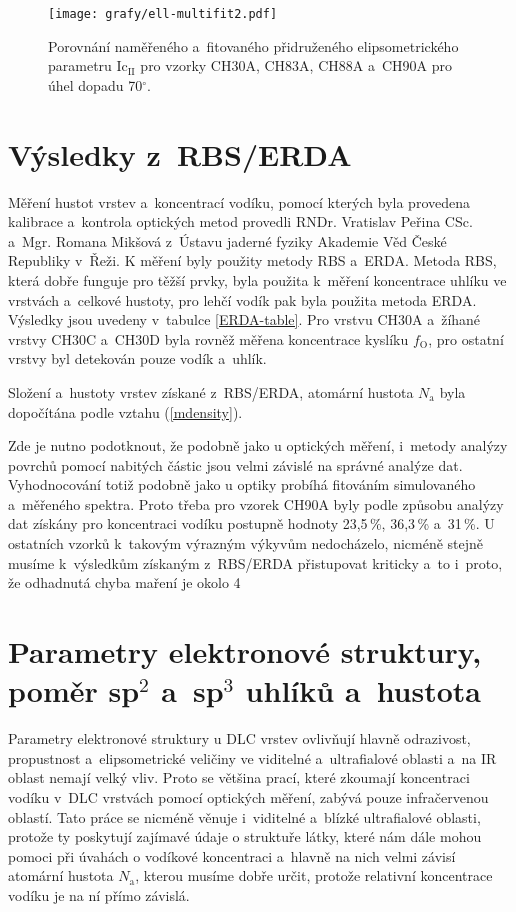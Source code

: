\begin{figure}[htp]
	\texttt{[image: grafy/ell-multifit2.pdf]}
	\caption{Porovnání naměřeného a~fitovaného přidruženého elipsometrického parametru Ic$_{\mathrm{II}}$ pro vzorky CH30A, CH83A, CH88A a~CH90A pro úhel dopadu 70$^\circ$.}
	\label{ell-multifit2}
\end{figure}

\section{Výsledky z~RBS/ERDA}
Měření hustot vrstev a~koncentrací vodíku, pomocí kterých byla provedena kalibrace a~kontrola optických metod provedli RNDr. Vratislav Peřina CSc. a~Mgr. Romana Mikšová z~Ústavu jaderné fyziky Akademie Věd České Republiky v~Řeži. K měření byly použity metody RBS a~ERDA. Metoda RBS, která dobře funguje pro těžší prvky, byla použita k~měření koncentrace uhlíku ve vrstvách a~celkové hustoty, pro lehčí vodík pak byla použita metoda ERDA. Výsledky jsou uvedeny v~tabulce \ref{ERDA-table}. Pro vrstvu CH30A a~žíhané vrstvy CH30C a~CH30D byla rovněž měřena koncentrace kyslíku $f_\mathrm{O}$, pro ostatní vrstvy byl detekován pouze vodík a~uhlík.

\begin{table}[h!]
 \centering
	\renewcommand{\tabcolsep}{4pt}
 
 \caption{Složení a~hustoty vrstev získané z~RBS/ERDA, atomární hustota $N_\mathrm{a}$ byla dopočítána podle vztahu (\ref{mdensity}).}
\label{ERDA-table}
\end{table}

Zde je nutno podotknout, že podobně jako u optických měření, i~metody analýzy povrchů pomocí nabitých částic jsou velmi závislé na správné analýze dat. Vyhodnocování totiž podobně jako u optiky probíhá fitováním simulovaného a~měřeného spektra. Proto třeba pro vzorek CH90A byly podle způsobu analýzy dat získány pro koncentraci vodíku postupně hodnoty 23,5\,\%, 36,3\,\% a~31\,\%. U ostatních vzorků k~takovým výrazným výkyvům nedocházelo, nicméně stejně musíme k~výsledkům získaným z~RBS/ERDA přistupovat kriticky a~to i~proto, že odhadnutá chyba maření je okolo 4\,%

\section{Parametry elektronové struktury, poměr sp$^2$ a~sp$^3$ uhlíků a~hustota}
Parametry elektronové struktury u DLC vrstev ovlivňují hlavně odrazivost, propustnost a~elipsometrické veličiny ve viditelné a~ultrafialové oblasti a~na IR oblast nemají velký vliv. 
Proto se většina prací, které zkoumají koncentraci vodíku v~DLC vrstvách pomocí optických měření, zabývá pouze infračervenou oblastí. Tato práce se nicméně věnuje i~viditelné a~blízké ultrafialové oblasti, protože ty poskytují zajímavé údaje o struktuře látky, které nám dále mohou pomoci při úvahách o vodíkové koncentraci a~hlavně na nich velmi závisí atomární hustota $N_\mathrm{a}$, kterou musíme dobře určit, protože relativní koncentrace vodíku je na ní přímo závislá. 

